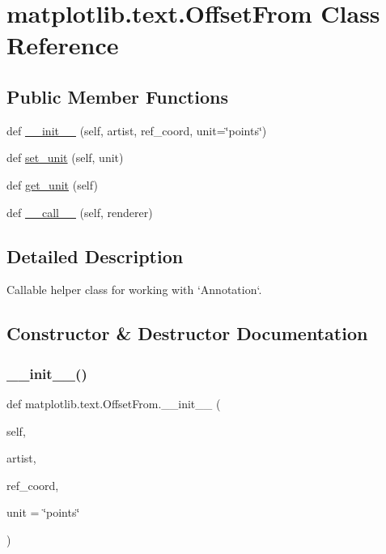 \hypertarget{classmatplotlib_1_1text_1_1OffsetFrom}{}\section{matplotlib.\+text.\+Offset\+From Class Reference}
\label{classmatplotlib_1_1text_1_1OffsetFrom}
\subsection*{Public Member Functions}
\begin{DoxyCompactItemize}
\item 
def \hyperlink{classmatplotlib_1_1text_1_1OffsetFrom_a4ed8077bfb99cb692c2fd4401aee1dfd}{\+\_\+\+\_\+init\+\_\+\+\_\+} (self, artist, ref\+\_\+coord, unit=\char`\"{}points\char`\"{})
\item 
def \hyperlink{classmatplotlib_1_1text_1_1OffsetFrom_aff16dc535b12bdf8dff86aa04bdaf422}{set\+\_\+unit} (self, unit)
\item 
def \hyperlink{classmatplotlib_1_1text_1_1OffsetFrom_a8f92c414160af4f3da555fd08fc0b30c}{get\+\_\+unit} (self)
\item 
def \hyperlink{classmatplotlib_1_1text_1_1OffsetFrom_a974c14ca806ca869c87b888e5fc20b9a}{\+\_\+\+\_\+call\+\_\+\+\_\+} (self, renderer)
\end{DoxyCompactItemize}


\subsection{Detailed Description}
\begin{DoxyVerb}Callable helper class for working with `Annotation`.\end{DoxyVerb}
 

\subsection{Constructor \& Destructor Documentation}
\mbox{\label{classmatplotlib_1_1text_1_1OffsetFrom_a4ed8077bfb99cb692c2fd4401aee1dfd}} 
\subsubsection{\texorpdfstring{\+\_\+\+\_\+init\+\_\+\+\_\+()}{\_\_init\_\_()}}
{\footnotesize\ttfamily def matplotlib.\+text.\+Offset\+From.\+\_\+\+\_\+init\+\_\+\+\_\+ (\begin{DoxyParamCaption}\item[{}]{self,  }\item[{}]{artist,  }\item[{}]{ref\+\_\+coord,  }\item[{}]{unit = {\ttfamily \char`\"{}points\char`\"{}} }\end{DoxyParamCaption})}

